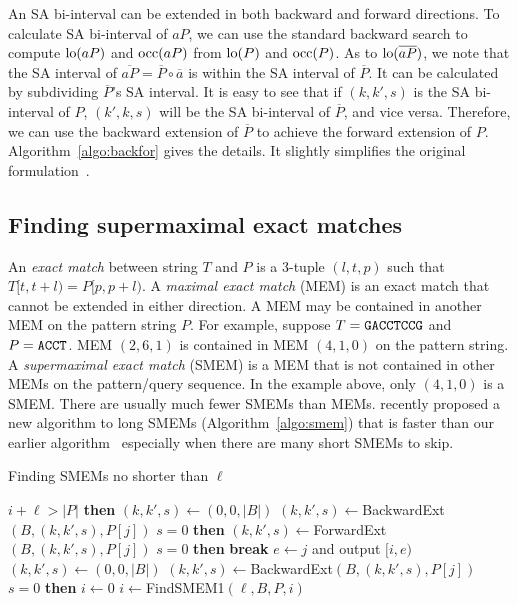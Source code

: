 \documentclass[webpdf,contemporary,large,namedate]{oup-authoring-template}%
\begin{document}
An SA bi-interval can be extended in both backward and forward directions.
To calculate SA bi-interval of $aP$, we can use the standard backward search to compute ${\rm lo}(aP)$ and ${\rm occ}(aP)$ from ${\rm lo}(P)$ and ${\rm occ}(P)$.
As to ${\rm lo}(\overline{aP})$, we note that the SA interval of $\overline{aP}=\overline{P}\circ\overline{a}$ is within the SA interval of $\overline{P}$.
It can be calculated by subdividing $\overline{P}$'s SA interval.
It is easy to see that if $(k,k',s)$ is the SA bi-interval of $P$, $(k',k,s)$ will be the SA bi-interval of $\overline{P}$, and vice versa.
Therefore, we can use the backward extension of $\overline{P}$ to achieve the forward extension of $P$.
Algorithm~\ref{algo:backfor} gives the details.
It slightly simplifies the original formulation~\citep{Li:2012fk}.

\subsection{Finding supermaximal exact matches}

An \emph{exact match} between string $T$ and $P$ is a 3-tuple $(l,t,p)$ such that $T[t,t+l)=P[p,p+l)$.
A \emph{maximal exact match} (MEM) is an exact match that cannot be extended in either direction.
A MEM may be contained in another MEM on the pattern string $P$.
For example, suppose $T={\tt GACCTCCG}$ and $P={\tt ACCT}$.
MEM $(2,6,1)$ is contained in MEM $(4,1,0)$ on the pattern string.
A \emph{supermaximal exact match} (SMEM) is a MEM that is not contained in other MEMs on the pattern/query sequence.
In the example above, only $(4,1,0)$ is a SMEM.
There are usually much fewer SMEMs than MEMs.
\citet{DBLP:conf/dlt/Gagie24} recently proposed a new algorithm to long SMEMs (Algorithm~\ref{algo:smem})
that is faster than our earlier algorithm~\citep{Li:2012fk}
especially when there are many short SMEMs to skip.

\begin{algorithm}
	\caption{Finding SMEMs no shorter than $\ell$~\citep{DBLP:conf/dlt/Gagie24}}\label{algo:smem}
	\begin{algorithmic}[1]
			 $i+\ell>|P|$ {\bf then} 
			\State $(k,k',s)\gets(0,0,|B|)$
				\State $(k,k',s)\gets${\sc BackwardExt}$(B,(k,k',s),P[j])$
				 $s=0$ {\bf then} 
			\EndFor
				\State $(k,k',s)\gets${\sc ForwardExt}$(B,(k,k',s),P[j])$
				 $s=0$ {\bf then} {\bf break}
			\EndFor
			\State $e\gets j$ and output $[i,e)$
			\State $(k,k',s)\gets(0,0,|B|)$
				\State $(k,k',s)\gets${\sc BackwardExt}$(B,(k,k',s),P[j])$
				 $s=0$ {\bf then} 
			\EndFor
		\EndProcedure
			\State $i\gets0$
			\Repeat
			\State $i\gets${\sc FindSMEM1}$(\ell,B,P,i)$
		\EndProcedure
	\end{algorithmic}
\end{algorithm}
\end{document}
